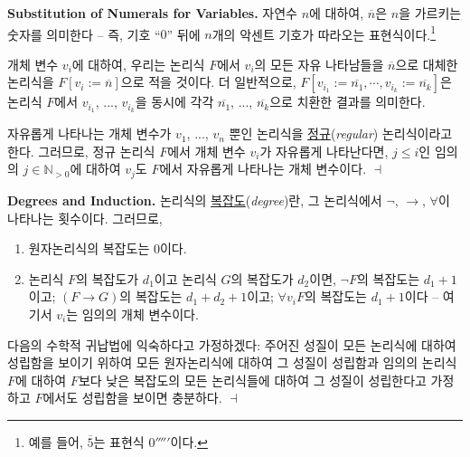 \documentclass[12pt]{paper}
\newenvironment{context}[1][]
{ \noindent \textbf{{#1}.} }
{ \hfill $ \dashv $ }
\begin{document}
\begin{context}[Substitution of Numerals for Variables]
자연수 $n$에 대하여, $\overline{n}$은 $n$을 가르키는 숫자를 의미한다 --
즉, 기호 ``$0$'' 뒤에 $n$개의 악센트 기호가 따라오는 표현식이다.\footnote
{
예를 들어, $\overline{5}$는 표현식 $0'''''$이다.
}

개체 변수 $v_{i}$에 대하여, 우리는 논리식 $F$에서 $v_{i}$의 모든 자유 나타남들을 $\overline{n}$으로 대체한 논리식을 $F \left[ v_{i} := \overline{n} \right]$으로 적을 것이다.
더 일반적으로, $F \left[ v_{i_{1}} := \overline{n_{1}} , \cdots , v_{i_{k}} := \overline{n_{k}} \right]$은 논리식 $F$에서 $v_{i_{1}}$, ..., $v_{i_{k}}$을 동시에 각각 $\overline{n_{1}}$, ..., $\overline{n_{k}}$으로 치환한 결과를 의미한다.

자유롭게 나타나는 개체 변수가 $v_{1}$, ..., $v_{n}$ 뿐인 논리식을 \underline{정규}(\textit{regular}) 논리식이라고 한다.
그러므로, 정규 논리식 $F$에서 개체 변수 $v_{i}$가 자유롭게 나타난다면,
$j \leq i$인 임의의 $j \in \mathbb{N}_{>0}$에 대하여 $v_{j}$도 $F$에서 자유롭게 나타나는 개체 변수이다.
\end{context}

\begin{context}[Degrees and Induction]
논리식의 \underline{복잡도}(\textit{degree})란, 그 논리식에서 $\lnot$, $\rightarrow$, $\forall$이 나타나는 횟수이다.
그러므로,
\begin{enumerate}
\item 원자논리식의 복잡도는 $0$이다.
\item 논리식 $F$의 복잡도가 $d_{1}$이고 논리식 $G$의 복잡도가 $d_{2}$이면,
$\lnot F$의 복잡도는 $d_{1} + 1$이고;
$\left( F \rightarrow G \right)$의 복잡도는 $d_{1} + d_{2} + 1$이고;
$\forall v_{i} F$의 복잡도는 $d_{1} + 1$이다 --
여기서 $v_{i}$는 임의의 개체 변수이다.
\end{enumerate}

다음의 수학적 귀납법에 익숙하다고 가정하겠다:
주어진 성질이 모든 논리식에 대하여 성립함을 보이기 위하여
모든 원자논리식에 대하여 그 성질이 성립함과
임의의 논리식 $F$에 대하여 $F$보다 낮은 복잡도의 모든 논리식들에 대하여 그 성질이 성립한다고 가정하고
$F$에서도 성립함을 보이면 충분하다.
\end{context}
\end{document}
